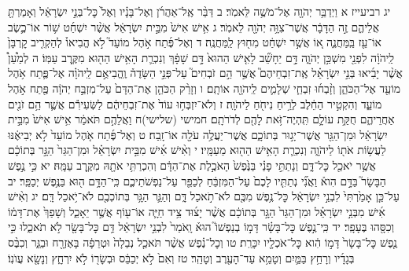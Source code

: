 \documentclass[twoside, openany, parskip=half, 11pt]{book}
\begin{document}
יג רביעייז א וַיְדַבֵּ֥ר יְהֹוָ֖ה אֶל־מֹשֶׁ֥ה לֵּאמֹֽר׃ ב דַּבֵּ֨ר אֶֽל־אַהֲרֹ֜ן וְאֶל־בָּנָ֗יו וְאֶל֙ כׇּל־בְּנֵ֣י יִשְׂרָאֵ֔ל וְאָמַרְתָּ֖ אֲלֵיהֶ֑ם זֶ֣ה הַדָּבָ֔ר אֲשֶׁר־צִוָּ֥ה יְהֹוָ֖ה לֵאמֹֽר׃ ג אִ֥ישׁ אִישׁ֙ מִבֵּ֣ית יִשְׂרָאֵ֔ל אֲשֶׁ֨ר יִשְׁחַ֜ט שׁ֥וֹר אוֹ־כֶ֛שֶׂב אוֹ־עֵ֖ז בַּֽמַּחֲנֶ֑ה א֚וֹ אֲשֶׁ֣ר יִשְׁחַ֔ט מִח֖וּץ לַֽמַּחֲנֶֽה׃ ד וְאֶל־פֶּ֜תַח אֹ֣הֶל מוֹעֵד֮ לֹ֣א הֱבִיאוֹ֒ לְהַקְרִ֤יב קׇרְבָּן֙ לַֽיהֹוָ֔ה לִפְנֵ֖י מִשְׁכַּ֣ן יְהֹוָ֑ה דָּ֣ם יֵחָשֵׁ֞ב לָאִ֤ישׁ הַהוּא֙ דָּ֣ם שָׁפָ֔ךְ וְנִכְרַ֛ת הָאִ֥ישׁ הַה֖וּא מִקֶּ֥רֶב עַמּֽוֹ׃ ה לְמַ֩עַן֩ אֲשֶׁ֨ר יָבִ֜יאוּ בְּנֵ֣י יִשְׂרָאֵ֗ל אֶֽת־זִבְחֵיהֶם֮ אֲשֶׁ֣ר הֵ֣ם זֹבְחִים֮ עַל־פְּנֵ֣י הַשָּׂדֶה֒ וֶֽהֱבִיאֻ֣ם לַֽיהֹוָ֗ה אֶל־פֶּ֛תַח אֹ֥הֶל מוֹעֵ֖ד אֶל־הַכֹּהֵ֑ן וְזָ֨בְח֜וּ זִבְחֵ֧י שְׁלָמִ֛ים לַֽיהֹוָ֖ה אוֹתָֽם׃ ו וְזָרַ֨ק הַכֹּהֵ֤ן אֶת־הַדָּם֙ עַל־מִזְבַּ֣ח יְהֹוָ֔ה פֶּ֖תַח אֹ֣הֶל מוֹעֵ֑ד וְהִקְטִ֣יר הַחֵ֔לֶב לְרֵ֥יחַ נִיחֹ֖חַ לַיהֹוָֽה׃ ז וְלֹא־יִזְבְּח֥וּ עוֹד֙ אֶת־זִבְחֵיהֶ֔ם לַשְּׂעִירִ֕ם אֲשֶׁ֛ר הֵ֥ם זֹנִ֖ים אַחֲרֵיהֶ֑ם חֻקַּ֥ת עוֹלָ֛ם תִּֽהְיֶה־זֹּ֥את לָהֶ֖ם לְדֹרֹתָֽם׃ חמישי (שלישי)ח וַאֲלֵהֶ֣ם תֹּאמַ֔ר אִ֥ישׁ אִישׁ֙ מִבֵּ֣ית יִשְׂרָאֵ֔ל וּמִן־הַגֵּ֖ר אֲשֶׁר־יָג֣וּר בְּתוֹכָ֑ם אֲשֶׁר־יַעֲלֶ֥ה עֹלָ֖ה אוֹ־זָֽבַח׃ ט וְאֶל־פֶּ֜תַח אֹ֤הֶל מוֹעֵד֙ לֹ֣א יְבִיאֶ֔נּוּ לַעֲשׂ֥וֹת אֹת֖וֹ לַיהֹוָ֑ה וְנִכְרַ֛ת הָאִ֥ישׁ הַה֖וּא מֵעַמָּֽיו׃ י וְאִ֨ישׁ אִ֜ישׁ מִבֵּ֣ית יִשְׂרָאֵ֗ל וּמִן־הַגֵּר֙ הַגָּ֣ר בְּתוֹכָ֔ם אֲשֶׁ֥ר יֹאכַ֖ל כׇּל־דָּ֑ם וְנָתַתִּ֣י פָנַ֗י בַּנֶּ֙פֶשׁ֙ הָאֹכֶ֣לֶת אֶת־הַדָּ֔ם וְהִכְרַתִּ֥י אֹתָ֖הּ מִקֶּ֥רֶב עַמָּֽהּ׃ יא כִּ֣י נֶ֣פֶשׁ הַבָּשָׂר֮ בַּדָּ֣ם הִוא֒ וַאֲנִ֞י נְתַתִּ֤יו לָכֶם֙ עַל־הַמִּזְבֵּ֔חַ לְכַפֵּ֖ר עַל־נַפְשֹׁתֵיכֶ֑ם כִּֽי־הַדָּ֥ם ה֖וּא בַּנֶּ֥פֶשׁ יְכַפֵּֽר׃ יב עַל־כֵּ֤ן אָמַ֙רְתִּי֙ לִבְנֵ֣י יִשְׂרָאֵ֔ל כׇּל־נֶ֥פֶשׁ מִכֶּ֖ם לֹא־תֹ֣אכַל דָּ֑ם וְהַגֵּ֛ר הַגָּ֥ר בְּתוֹכְכֶ֖ם לֹא־יֹ֥אכַל דָּֽם׃ יג וְאִ֨ישׁ אִ֜ישׁ מִבְּנֵ֣י יִשְׂרָאֵ֗ל וּמִן־הַגֵּר֙ הַגָּ֣ר בְּתוֹכָ֔ם אֲשֶׁ֨ר יָצ֜וּד צֵ֥יד חַיָּ֛ה אוֹ־ע֖וֹף אֲשֶׁ֣ר יֵאָכֵ֑ל וְשָׁפַךְ֙ אֶת־דָּמ֔וֹ וְכִסָּ֖הוּ בֶּעָפָֽר׃ יד כִּֽי־נֶ֣פֶשׁ כׇּל־בָּשָׂ֗ר דָּמ֣וֹ בְנַפְשׁוֹ֮ הוּא֒ וָֽאֹמַר֙ לִבְנֵ֣י יִשְׂרָאֵ֔ל דַּ֥ם כׇּל־בָּשָׂ֖ר לֹ֣א תֹאכֵ֑לוּ כִּ֣י נֶ֤פֶשׁ כׇּל־בָּשָׂר֙ דָּמ֣וֹ הִ֔וא כׇּל־אֹכְלָ֖יו יִכָּרֵֽת׃ טו וְכׇל־נֶ֗פֶשׁ אֲשֶׁ֨ר תֹּאכַ֤ל נְבֵלָה֙ וּטְרֵפָ֔ה בָּאֶזְרָ֖ח וּבַגֵּ֑ר וְכִבֶּ֨ס בְּגָדָ֜יו וְרָחַ֥ץ בַּמַּ֛יִם וְטָמֵ֥א עַד־הָעֶ֖רֶב וְטָהֵֽר׃ טז וְאִם֙ לֹ֣א יְכַבֵּ֔ס וּבְשָׂר֖וֹ לֹ֣א יִרְחָ֑ץ וְנָשָׂ֖א עֲוֺנֽוֹ׃
\end{document}
